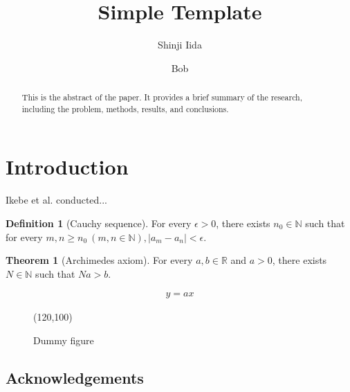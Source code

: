 \documentclass[12pt,dvipdfmx]{article}
\title{Simple Template}
\author[1]{Shinji Iida}
\author[1,2]{Bob}
\affil[1]{XXX University}
\affil[2]{YYY Univerisity}
\date{\empty}
\theoremstyle{definition} %
\newtheorem{dfn}{Definition}
\newtheorem{thm}{Theorem}
\begin{document}
\maketitle
\begin{abstract}
This is the abstract of the paper. It provides a brief summary of the research, including the problem, methods, results, and conclusions.
\end{abstract}

\section*{Introduction}
Ikebe et al. conducted...\cite{Ikebe2016-sg}

\begin{dfn}[Cauchy sequence]
For every $\epsilon > 0$, there exists $n_0 \in \mathbb{N}$ such that for every $m, n \ge n_0 \ (m,n \in \mathbb{N}),  \lvert a_m  - a_n  \rvert < \epsilon $.
\end{dfn}	

\begin{thm}[Archimedes axiom]
For every $a, b \in \mathbb{R}$ and $a > 0$, there exists $N \in \mathbb{N}$ such that $Na > b$.
\end{thm}

\begin{align}
y=ax
\end{align}

\begin{figure}[htbp]
    \centering
    \framebox(120,100){} 
    \caption{Dummy figure}
    \label{fig:dummy}
\end{figure}

\subsection*{Acknowledgements}




%
\end{document}
